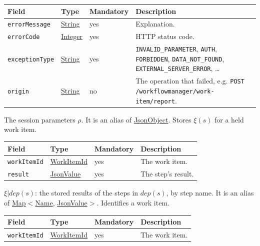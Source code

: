 \documentclass[a4paper]{arrowhead}
\newcommand{\pref}[1]{{\textcolor{ArrowheadGrey}{\hyperref[sec:model:primitives:#1]{#1}}}}
\begin{document}
{\small
\begin{longtable}{|p{3.7cm}|p{4.2cm}|p{1.6cm}|p{6.3cm}|}

\hline
\rowcolor{gray!33} Field & Type & Mandatory & Description \\ \hline
\endhead
\texttt{errorMessage} & \pref{String} & yes & Explanation. \\ \hline
\texttt{errorCode} & \pref{Integer} & yes & HTTP status code. \\ \hline
\texttt{exceptionType} & \pref{String} & yes & \texttt{INVALID\_\allowbreak{}PARAMETER}, \texttt{AUTH}, \texttt{FORBIDDEN}, \texttt{DATA\_\allowbreak{}NOT\_\allowbreak{}FOUND}, \texttt{EXTERNAL\_\allowbreak{}SERVER\_\allowbreak{}ERROR}, \ldots \\ \hline
\texttt{origin} & \pref{String} & no & The operation that failed, e.g. \texttt{POST /\allowbreak{}workflowmanager/\allowbreak{}work-\allowbreak{}item/\allowbreak{}report}. \\ \hline
\end{longtable}
}

The session parameters $\rho$.
 It is an alias of \pref{JsonObject}.
Stores $\xi(s)$ for a held work item.

{\small
\begin{longtable}{|p{3.7cm}|p{4.2cm}|p{1.6cm}|p{6.3cm}|}

\hline
\rowcolor{gray!33} Field & Type & Mandatory & Description \\ \hline
\endhead
\texttt{workItemId} & \pref{WorkItemId} & yes & The work item. \\ \hline
\texttt{result} & \pref{JsonValue} & yes & The step's result. \\ \hline
\end{longtable}
}

$\xi|dep(s)$: the stored results of the steps in $dep(s)$, by step name.
 It is an alias of \pref{Map}$<$\pref{Name}, \pref{JsonValue}$>$.
Identifies a work item.

{\small
\begin{longtable}{|p{3.7cm}|p{4.2cm}|p{1.6cm}|p{6.3cm}|}

\hline
\rowcolor{gray!33} Field & Type & Mandatory & Description \\ \hline
\endhead
\texttt{workItemId} & \pref{WorkItemId} & yes & The work item. \\ \hline
\end{longtable}
}
\end{document}
